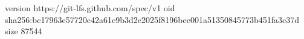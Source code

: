 version https://git-lfs.github.com/spec/v1
oid sha256:bc17963e57720c42a61e9b3d2e2025f8196bee001a51350845773b451fa3c37d
size 87544
